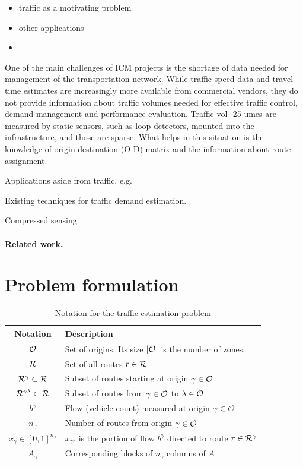\documentclass{article} %
\newcommand{\OO}{{\cal O}}
\newcommand{\RR}{{\cal R}}
\begin{document}
\begin{itemize}
\item traffic as a motivating problem
\item other applications
\item 
\end{itemize}

One of the main challenges of ICM projects is the shortage of data needed for management
of the transportation network. While traffic speed data and travel time estimates are increasingly more available from commercial vendors, they do not provide information about traffic volumes needed for effective traffic control, demand management and performance evaluation. Traffic vol-
25 umes are measured by static sensors, such as loop detectors, mounted into the infrastructure, and those are sparse. What helps in this situation is the knowledge of origin-destination (O-D) matrix and the information about route assignment.

Applications aside from traffic, e.g.

Existing techniques for traffic demand estimation.

Compressed sensing


\paragraph{Related work.}
\section{Problem formulation}
\begin{table}[htbp]
\caption{Notation for the traffic estimation problem}
\label{tab-notation}
\centering
\begin{tabular}{cl}
\toprule
Notation & Description \\
\midrule
$\OO$ & Set of origins. Its size $|\OO|$ is the number of zones. \\
$\RR$ & Set of all routes $r\in \RR$\\
$\RR^\gamma \subset\RR$ & Subset of routes starting at origin $\gamma\in\OO$ \\
$\RR^{\gamma \lambda} \subset\RR$ & Subset of routes from $\gamma\in\OO$ to $\lambda\in \OO$ \\
$b^\gamma$ & Flow (vehicle count) measured at origin $\gamma\in\OO$ \\
$n_\gamma$ & Number of routes from origin $\gamma\in \OO$\\
$x_\gamma \in[0, 1]^{n_\gamma}$ & $x_{\gamma r}$ is the portion of flow $b^\gamma$ directed to route $r \in \RR^\gamma$ \\
$A_{\gamma}$ & Corresponding blocks of $n_{\gamma}$ columns of $A$\\
\bottomrule
\end{tabular}
\end{table}
\end{document}
